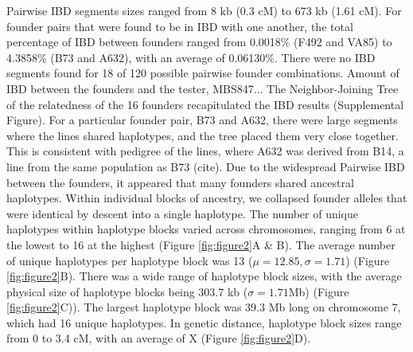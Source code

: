 \documentclass[article,9pt,twocolumn,twoside]{rilabRxiv}
\begin{document}
Pairwise IBD segments sizes ranged from 8 kb (0.3 cM) to  673 kb (1.61 cM).
For founder pairs that were found to be in IBD with one another, the total percentage of IBD between founders ranged from 0.0018\% (F492 and VA85) to 4.3858\% (B73 and A632), with an average of 0.06130\%.
There were no IBD segments found for 18 of 120 possible pairwise founder combinations.
Amount of IBD between the founders and the tester, MBS847...
The Neighbor-Joining Tree of the relatedness of the 16 founders recapitulated the IBD results (Supplemental Figure).
For a particular founder pair, B73 and A632, there were large segments where the lines shared haplotypes, and the tree placed them very close together.
This is consistent with pedigree of the lines, where A632 was derived from B14, a line from the same population as B73 (cite).
Due to the widespread Pairwise IBD between the founders, it appeared that many founders shared ancestral haplotypes.
Within individual blocks of ancestry, we collapsed founder alleles that were identical by descent into a single haplotype.
The number of unique haplotypes within haplotype blocks varied across chromosomes, ranging from 6 at the lowest to 16 at the highest (Figure  \ref{fig:figure2}A & B).
The average number of unique haplotypes per haplotype block was 13 ($\mu = 12.85, \sigma =1.71$) (Figure \ref{fig:figure2}B).
There was a wide range of haplotype block sizes, with the average physical size of haplotype blocks being 303.7 kb ($\sigma =1.71$Mb) (Figure \ref{fig:figure2}C)).
The largest haplotype block was 39.3 Mb long on chromosome 7, which had 16 unique haplotypes.
In genetic distance, haplotype block sizes range from 0 to 3.4 cM, with an average of X (Figure \ref{fig:figure2}D).
\end{document}
